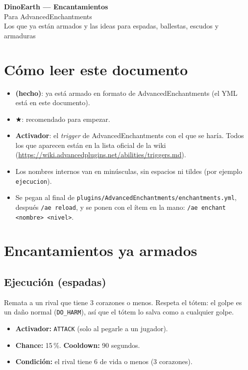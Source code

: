 \documentclass[11pt,a4paper]{article}
\newcommand{\tr}[1]{\texttt{\small #1}}           %
\newcommand{\rec}{\textcolor{rosa}{\textbf{$\bigstar$}}} %
\newcommand{\hecho}{\textcolor{azul}{\textbf{(hecho)}}}
\begin{document}
\begin{center}
  {\LARGE\bfseries\textcolor{azul}{DinoEarth} --- Encantamientos}\\[4pt]
  {\large Para AdvancedEnchantments}\\[2pt]
  {\small\textcolor{gris}{Los que ya están armados y las ideas para espadas, ballestas, escudos y armaduras}}
\end{center}

\section*{Cómo leer este documento}
\begin{itemize}[leftmargin=*]
  \item \hecho: ya está armado en formato de AdvancedEnchantments (el YML está en este documento).
  \item \rec: recomendado para empezar.
  \item \textbf{Activador}: el \emph{trigger} de AdvancedEnchantments con el que se haría. Todos los que aparecen
        están en la lista oficial de la wiki (\url{https://wiki.advancedplugins.net/abilities/triggers.md}).
  \item Los nombres internos van en minúsculas, sin espacios ni tildes (por ejemplo \tr{ejecucion}).
  \item Se pegan al final de \tr{plugins/AdvancedEnchantments/enchantments.yml}, después \tr{/ae reload}, y se ponen
        con el ítem en la mano: \tr{/ae enchant <nombre> <nivel>}.
\end{itemize}

\section{Encantamientos ya armados}

\subsection{Ejecución (espadas)}
Remata a un rival que tiene 3 corazones o menos. Respeta el tótem: el golpe es un daño normal
(\tr{DO\_HARM}), así que el tótem lo salva como a cualquier golpe.
\begin{itemize}[leftmargin=*,itemsep=0pt]
  \item \textbf{Activador:} \tr{ATTACK} (solo al pegarle a un jugador).
  \item \textbf{Chance:} 15\,\%. \quad \textbf{Cooldown:} 90 segundos.
  \item \textbf{Condición:} el rival tiene 6 de vida o menos (3 corazones).
\end{itemize}
\end{document}

